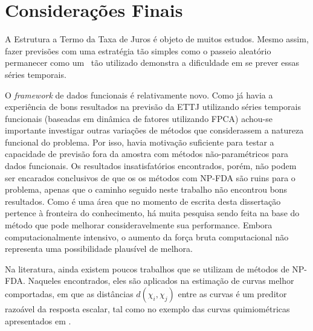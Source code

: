 \documentclass[
	12pt,				%
	openright,			%
	oneside,			%
	a4paper,			%
	english,			%
	brazil				%
	]{dissertacao-ufrgs-abntex2}
\begin{document}


\chapter*[Conclusão]{Considerações Finais} \label{ch:conclusao}

A Estrutura a Termo da Taxa de Juros é objeto de muitos estudos. Mesmo assim, fazer previsões com uma estratégia tão simples como o passeio aleatório permanecer como um \bm~tão utilizado demonstra a dificuldade em se prever essas séries temporais.

O \emph{framework} de dados funcionais é relativamente novo. Como já havia a experiência de bons resultados na previsão da ETTJ utilizando séries temporais funcionais (baseadas em dinâmica de fatores utilizando FPCA) achou-se importante investigar outras variações de métodos que considerassem a natureza funcional do problema. Por isso, havia motivação suficiente para testar a capacidade de previsão fora da amostra com métodos não-paramétricos para dados funcionais. Os resultados insatisfatórios encontrados, porém, não podem ser encarados conclusivos de que os os métodos com NP-FDA são ruins para o problema, apenas que o caminho seguido neste trabalho não encontrou bons resultados. Como é uma área que no momento de escrita desta dissertação pertence à fronteira do conhecimento, há muita pesquisa sendo feita na base do método que pode melhorar consideravelmente sua performance. Embora computacionalmente intensivo, o aumento da força bruta computacional não representa uma possibilidade plausível de melhora.

Na literatura, ainda existem poucos trabalhos que se utilizam de métodos de NP-FDA. Naqueles encontrados, eles são aplicados na estimação de curvas melhor comportadas, em que as distâncias $d(\chi_i,\chi_j)$ entre as curvas é um preditor razoável da resposta escalar, tal como no exemplo das curvas quimiométricas apresentados em . 
\end{document}
